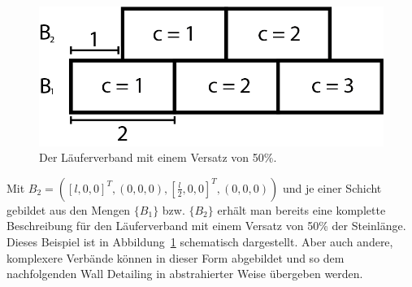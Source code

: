 \begin{figure}[hb!]
    \centering
    \includegraphics[width=0.7\columnwidth]{fig/concept_Mauerwerksverband.png}
    \caption{Der Läuferverband mit einem Versatz von 50\%.}\label{fig:concept:concept_Mauerwerksverband}
\end{figure}

Mit \(B_2 = ({[l, 0, 0]}^T, (0, 0, 0), {[\frac{l}{2}, 0, 0]}^T, (0, 0, 0))\) und je einer Schicht gebildet aus den Mengen \(\{B_1\}\) bzw. \(\{B_2\}\) erhält man bereits eine komplette Beschreibung für den Läuferverband mit einem Versatz von 50\% der Steinlänge.
Dieses Beispiel ist in Abbildung~\ref{fig:concept:concept_Mauerwerksverband} schematisch dargestellt.
Aber auch andere, komplexere Verbände können in dieser Form abgebildet und so dem nachfolgenden Wall Detailing in abstrahierter Weise übergeben werden.

